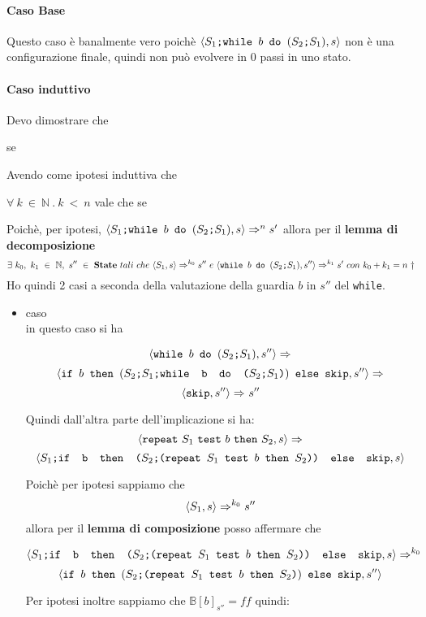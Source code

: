 {   \paragraph{Caso Base}
	 Questo caso è banalmente vero poichè $\confSs{\PDef{}}{s}$
	non è una configurazione finale, quindi non può evolvere in 0 passi in uno
	stato.
    \paragraph{Caso induttivo}
	Devo dimostrare che 
	\begin{center}
	se 
	\end{center}
	Avendo come ipotesi induttiva che 
	\begin{center}
	$\forall{}~k~\in~\mathbb{N}~.~k~<~n$ vale che se 
	\end{center}
	Poichè, per ipotesi, $\confSs{\PDef{}}{s}\Rar{n}s'$ allora per il
	\textbf{lemma di decomposizione} 
	\[ \exists{}~k_0,~k_1~\in~\mathbb{N},~
	s''~\in~\states{}~tali~che~\confSs{S_1}{s}\Rar{k_0}s''~e~\confSs{
	\wbS{b}{(\concat{$S_2$}{$S_1$})}}{s''}\Rar{k_1}s'~con~k_0+k_1=n$  $\dagger  \]
	Ho quindi 2 casi a seconda della valutazione della guardia $b$ in $s''$ del
	\texttt{while}.
	\begin{itemize}
		\item caso  \\
		in questo caso si ha 
		
		\[ \confSs{\wbS{b}{(\concat{$S_2$}{$S_1$})}}{s''}\Rar{} \]
		\[ \confSs{\ifABC{b}{(\concat{\concat{$S_2$}{$S_1$}}
		{\wbS{b}{(\concat{$S_2$}{$S_1$})}})}{\skipistr}}{s''}\Rar{} \]
		\[ \confSs{\skipistr}{s''}\Rar{}s'' \]

		Quindi dall'altra parte dell'implicazione si ha:
		\[ \confSs{\repeatSbS{S_1}{b}{S_2}}{s}\Rar{} \]
		\[ \confSs{\concat{$S_1$}{\ifABC{b}{(\concat{$S_2$}
		{(\repeatSbS{$S_1$}{$b$}{$S_2$})})}{\skipistr}}}{s} \]

		Poichè per ipotesi sappiamo che
		\[  \confSs{S_1}{s}\Rar{k_0}s'' \] allora
		per il \textbf{lemma di composizione} posso affermare che

		\[ \confSs{\concat{$S_1$}{\ifABC{b}{(\concat{$S_2$}
		{(\repeatSbS{$S_1$}{$b$}{$S_2$})})}{\skipistr}}}{s}\Rar{k_0} \]
		\[ \confSs{
			\ifABC{b}{(\concat{$S_2$}{(\repeatSbS{$S_1$}{$b$}{$S_2$})})} 
			{\skipistr}}{s''} \]

		Per ipotesi inoltre sappiamo che $\mathbb{B}[b]_{s''}=ff$ quindi:
	

\end{itemize}}
